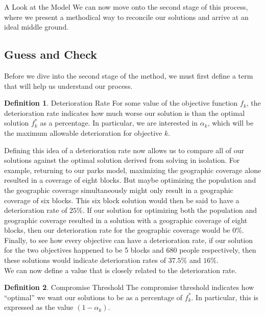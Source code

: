 \documentclass[12pt]{pom_thesis}
\theoremstyle{definition}
\newtheorem{definition}{Definition}[section]
\begin{document}
\begin{chapter}{A Look at the Model}
We can now move onto the second stage of this process, where we present a methodical way to reconcile our solutions and arrive at an ideal middle ground.
%
%
\subsection{Guess and Check}

Before we dive into the second stage of the method, we must first define a term that will help us understand our process. 

\begin{definition}{Deterioration Rate}
For some value of the objective function $f_k$, the deterioration rate indicates how much worse our solution is than the optimal solution $f_k^*$ as a percentage. In particular, we are interested in $\alpha_k$, which will be the maximum allowable deterioration for objective $k$.
\end{definition}

Defining this idea of a deterioration rate now allows us to compare all of our solutions against the optimal solution derived from solving in isolation. For example, returning to our parks model, maximizing the geographic coverage alone resulted in a coverage of eight blocks. But maybe optimizing the population and the geographic coverage simultaneously might only result in a geographic coverage of six blocks. This six block solution would then be said to have a deterioration rate of $25\%$. If our solution for optimizing both the population and geographic coverage resulted in a solution with a geographic coverage of eight blocks, then our deterioration rate for the geographic coverage would be $0\%$. Finally, to see how every objective can have a deterioration rate, if our solution for the two objectives happened to be 5 blocks and 680 people respectively, then these solutions would indicate deterioration rates of $37.5\%$ and $16\%$. \\

We can now define a value that is closely related to the deterioration rate.

\begin{definition}{Compromise Threshold}
The compromise threshold indicates how ``optimal'' we want our solutions to be as a percentage of $f_k^*$. In particular, this is expressed as the value $(1-\alpha_k)$.
\end{definition}


\end{chapter}
\end{document}
